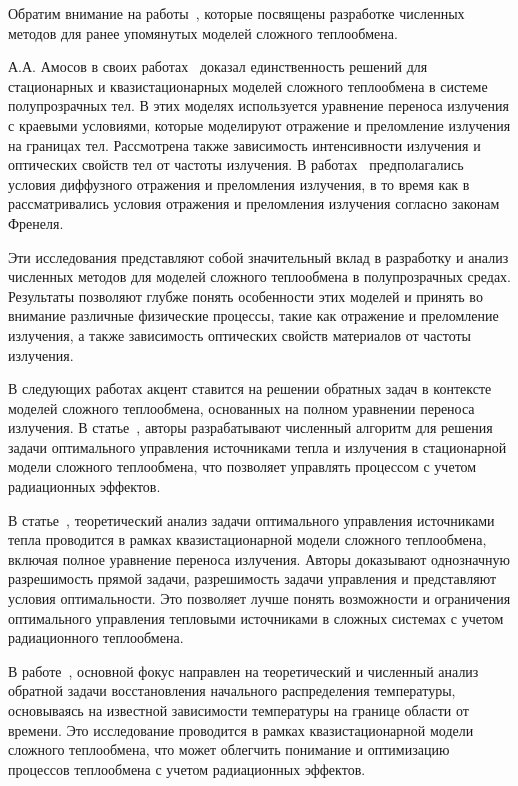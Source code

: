 Обратим внимание на работы~\cite{
    asllanaj2004convergence, asllanaj2007transient, banoczi1999fast,
    ghattassi2016galerkin, klein2005transient, kovtanyuk2012
}, которые посвящены разработке численных методов для ранее упомянутых моделей сложного теплообмена.

А.А. Амосов в своих работах~\cite{
    Amosov2016, Amosov2017, amosov2016unique, amosov2017unique
} доказал единственность решений для стационарных и квазистационарных
моделей сложного теплообмена в системе полупрозрачных тел.
В этих моделях используется уравнение переноса излучения с краевыми условиями,
которые моделируют отражение и преломление излучения на границах тел.
Рассмотрена также зависимость интенсивности излучения и оптических свойств
тел от частоты излучения.
В работах~\cite{
    Amosov2016, Amosov2017
} предполагались условия диффузного отражения и преломления излучения,
в то время как в~\cite{amosov2016unique, amosov2017unique} рассматривались условия
отражения и преломления излучения согласно законам Френеля.

Эти исследования представляют собой значительный вклад в разработку и анализ
численных методов для моделей сложного теплообмена в полупрозрачных средах.
Результаты позволяют глубже понять особенности этих моделей и принять во внимание
различные физические процессы, такие как отражение и преломление излучения,
а также зависимость оптических свойств материалов от частоты излучения.

В следующих работах акцент ставится на решении обратных задач в
контексте моделей сложного теплообмена, основанных на полном уравнении переноса излучения.
В статье~\cite{end2010optimization}, авторы разрабатывают численный алгоритм для решения
задачи оптимального управления источниками тепла и излучения в стационарной модели сложного
теплообмена, что позволяет управлять процессом с учетом радиационных эффектов.

В статье~\cite{end2011analytical}, теоретический анализ задачи оптимального
управления источниками тепла проводится в рамках квазистационарной модели сложного теплообмена,
включая полное уравнение переноса излучения.
Авторы доказывают однозначную разрешимость прямой задачи,
разрешимость задачи управления и представляют условия оптимальности.
Это позволяет лучше понять возможности и ограничения оптимального управления тепловыми
источниками в сложных системах с учетом радиационного теплообмена.

В работе~\cite{amosov2010stationary}, основной фокус направлен на теоретический
и численный анализ обратной задачи восстановления начального распределения температуры,
основываясь на известной зависимости температуры на границе области от времени.
Это исследование проводится в рамках квазистационарной модели сложного теплообмена,
что может облегчить понимание и оптимизацию процессов теплообмена с учетом радиационных эффектов.



